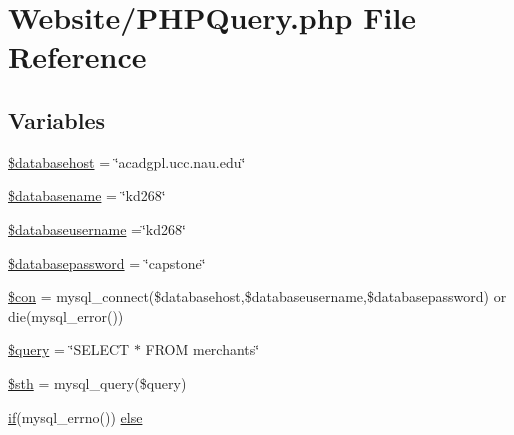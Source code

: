 \hypertarget{_p_h_p_query_8php}{\section{Website/\-P\-H\-P\-Query.php File Reference}
\label{_p_h_p_query_8php}
}
\subsection*{Variables}
\begin{DoxyCompactItemize}
\item 
\hyperlink{_p_h_p_query_8php_a034ead57b6864a4413371711e8d65372}{\$databasehost} = \char`\"{}acadgpl.\-ucc.\-nau.\-edu\char`\"{}
\item 
\hyperlink{_p_h_p_query_8php_aace53f8afce81b52040cef0cd850138a}{\$databasename} = \char`\"{}kd268\char`\"{}
\item 
\hyperlink{_p_h_p_query_8php_a251bf75f510d7c8b556c65d7c30e911f}{\$databaseusername} =\char`\"{}kd268\char`\"{}
\item 
\hyperlink{_p_h_p_query_8php_a1a07536b6a5f43f2d8f826bd2ee6c91a}{\$databasepassword} = \char`\"{}capstone\char`\"{}
\item 
\hyperlink{_p_h_p_query_8php_a0debe10448ec56a57b5509648408a549}{\$con} = mysql\-\_\-connect(\$databasehost,\$databaseusername,\$databasepassword) or die(mysql\-\_\-error())
\item 
\hyperlink{_p_h_p_query_8php_af59a5f7cd609e592c41dc3643efd3c98}{\$query} = \char`\"{}S\-E\-L\-E\-C\-T $\ast$ F\-R\-O\-M merchants\char`\"{}
\item 
\hyperlink{_p_h_p_query_8php_afa9126f9664959c02795be300a135f93}{\$sth} = mysql\-\_\-query(\$query)
\item 
\hyperlink{_m_c_maccount_settings_8php_a648419c218c2f0aeb239028519ab83d8}{if}(mysql\-\_\-errno()) \hyperlink{_p_h_p_query_8php_acd5fe7f2086f786c96623b819503b734}{else}
\end{DoxyCompactItemize}


